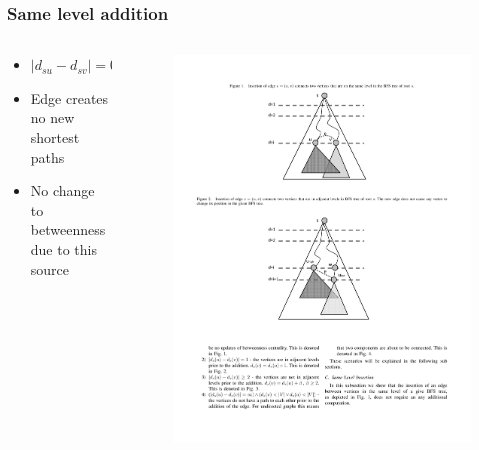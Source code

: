 \begin{frame}
  \frametitle{Same level addition}
  \begin{columns}[onlytextwidth]
  
    \begin{column}{0.5\textwidth}
      \begin{itemize}
        \item $|d_{su} - d_{sv}| = 0$
        \item Edge creates no new shortest paths
        \item No change to betweenness \\ due to this source
      \end{itemize}
    \end{column}
    
    \begin{column}{0.5\textwidth}
      \begin{figure}[t]
        \centering
        \includegraphics[width=\textwidth, height=\textheight, keepaspectratio]{imgs/green-0lvl-compressed}
      \end{figure}
    \end{column}
  \end{columns}
  
\end{frame}


